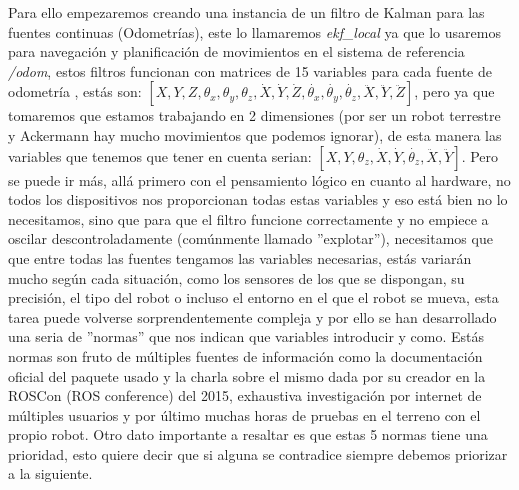 Para ello empezaremos creando una instancia de un filtro de Kalman para las fuentes continuas (Odometrías), este lo llamaremos 
\textit{ekf\_local} ya que lo usaremos para navegación y planificación de movimientos en el sistema de referencia \textit{/odom}, estos 
filtros funcionan con matrices de 15 variables para cada fuente de odometría  , estás son: 
$[ X,Y,Z,\theta_{x},\theta_{y},\theta_{z},\dot{X},\dot{Y},\dot{Z},\dot{\theta_{x}},\dot{\theta_{y}},\dot{\theta_{z}},\ddot{X},\ddot{Y},\ddot{Z} ]$,
pero ya que tomaremos que estamos trabajando en 2 dimensiones (por ser un robot terrestre y Ackermann hay mucho movimientos que podemos 
ignorar), de esta manera las variables que tenemos que tener en cuenta serian: 
$[ X,Y,\theta_{z},\dot{X},\dot{Y},\dot{\theta_{z}},\ddot{X},\ddot{Y}]$. Pero se puede ir más, allá primero con el pensamiento lógico en 
cuanto al hardware, no todos los dispositivos nos proporcionan todas estas variables y eso está bien no lo necesitamos, sino que para que 
el filtro funcione correctamente y no empiece a oscilar descontroladamente (comúnmente llamado ''explotar''), necesitamos que que entre 
todas las fuentes
tengamos las variables necesarias, estás variarán mucho según cada situación, como los sensores de los que se dispongan, su precisión, el 
tipo del robot o incluso el entorno en el que el robot se mueva, esta tarea puede volverse sorprendentemente compleja
y por ello se han desarrollado una seria de ''normas'' que nos indican que variables introducir y como. Estás normas son fruto de múltiples 
fuentes de información como la documentación oficial del paquete usado y la charla sobre el mismo dada por su creador en la ROSCon 
(ROS conference) del 2015, exhaustiva investigación por internet de múltiples usuarios y por último muchas horas de pruebas en el terreno 
con el propio robot. Otro dato importante a resaltar es que estas 5 normas tiene una prioridad, esto quiere decir que si alguna se 
contradice siempre debemos priorizar a la siguiente.  

